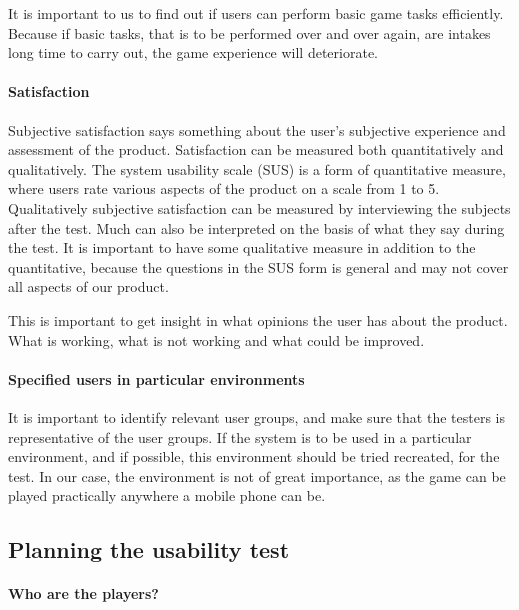 		It is important to us to find out if users can perform basic game tasks efficiently. Because if basic tasks, that is to be performed over and over again, are intakes long time to carry out, the game experience will deteriorate.

	\paragraph{Satisfaction}

		Subjective satisfaction says something about the user's subjective experience and assessment of the product. Satisfaction can be measured both quantitatively and qualitatively. The system usability scale (SUS) is a form of quantitative measure, where users rate various aspects of the product on a scale from 1 to 5. Qualitatively subjective satisfaction can be measured by interviewing the subjects after the test. Much can also be interpreted on the basis of what they say during the test. It is important to have some qualitative measure in addition to the quantitative, because the questions in the SUS form is general and may not cover all aspects of our product.

		This is important to get insight in what opinions the user has about the product. What is working, what is not working and what could be improved.

	\paragraph{Specified users in particular environments}

		It is important to identify relevant user groups, and make sure that the testers is representative of the user groups. If the system is to be used in a particular environment, and if possible, this environment should be tried recreated, for the test. In our case, the environment is not of great importance, as the game can be played practically anywhere a mobile phone can be.

\subsection{Planning the usability test}

	\paragraph{Who are the players?}\mbox{}\\

